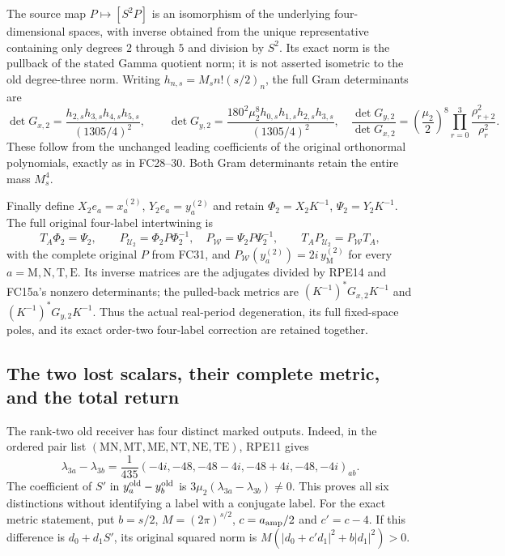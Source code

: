 The source map $P\mapsto[S^2P]$ is an isomorphism of the underlying
four-dimensional spaces, with inverse obtained from the unique
representative containing only degrees $2$ through $5$ and division
by $S^2$. Its exact norm is the pullback of the stated Gamma quotient
norm; it is not asserted isometric to the old degree-three norm.
Writing $h_{n,s}=M_sn!(s/2)_n$, the full Gram determinants are
\[
 \det G_{x,2}=
   \frac{h_{2,s}h_{3,s}h_{4,s}h_{5,s}}{(1305/4)^2},\qquad
 \det G_{y,2}=
   \frac{180^2\mu_2^8h_{0,s}h_{1,s}h_{2,s}h_{3,s}}{(1305/4)^2},
 \quad
 \frac{\det G_{y,2}}{\det G_{x,2}}
   =\left(\frac{\mu_2}2\right)^8
      \prod_{r=0}^3\frac{\rho_{r+2}^2}{\rho_r^2}.
 \tag{RPE17}
\]
These follow from the unchanged leading coefficients of the original
orthonormal polynomials, exactly as in FC28--30. Both Gram
determinants retain the entire mass $M_s^4$.

Finally define $X_2e_a=x_a^{(2)}$, $Y_2e_a=y_a^{(2)}$ and retain
$\Phi_2=X_2K^{-1}$, $\Psi_2=Y_2K^{-1}$.
The full original four-label intertwining is
\[
 T_A\Phi_2=\Psi_2,\qquad
 P_{\mathcal U_2}=\Phi_2P\Phi_2^{-1},\quad
 P_{\mathcal W}=\Psi_2P\Psi_2^{-1},\qquad
 T_AP_{\mathcal U_2}=P_{\mathcal W}T_A,
 \tag{RPE18}
\]
with the complete original $P$ from FC31, and
$P_{\mathcal W}(y_a^{(2)})=2i\,y_{\mathrm M}^{(2)}$ for every
$a=\mathrm M,\mathrm N,\mathrm T,\mathrm E$.
Its inverse matrices are the adjugates divided by RPE14 and FC15a's
nonzero determinants; the pulled-back metrics are
$(K^{-1})^*G_{x,2}K^{-1}$ and $(K^{-1})^*G_{y,2}K^{-1}$.
Thus the actual real-period degeneration, its full fixed-space poles,
and its exact order-two four-label correction are retained together.

\subsection{The two lost scalars, their complete metric, and the total return}
The rank-two old receiver has four distinct marked outputs. Indeed,
in the ordered pair list $(\mathrm{MN},\mathrm{MT},\mathrm{ME},
\mathrm{NT},\mathrm{NE},\mathrm{TE})$, RPE11 gives
\[
 \lambda_{3a}-\lambda_{3b}
  =\frac1{435}(-4i,-48,-48-4i,-48+4i,-48,-4i)_{ab}.
 \tag{RPE19}
\]
The coefficient of $S'$ in $y_a^{\rm old}-y_b^{\rm old}$ is
$3\mu_2(\lambda_{3a}-\lambda_{3b})\ne0$. This proves all six
distinctions without identifying a label with a conjugate label.
For the exact metric statement, put $b=s/2$, $M=(2\pi)^{s/2}$,
$c=a_{\rm amp}/2$ and $c'=c-4$. If this difference is $d_0+d_1S'$,
its original squared norm is
$M(|d_0+c'd_1|^2+b|d_1|^2)>0$.

